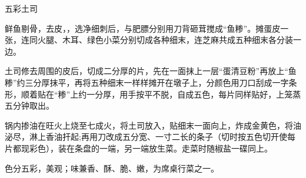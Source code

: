 \begin{recipe}{五彩土司}

\ingredients



\cooking

\step 鲜鱼剔骨，去皮，，选净细刺后，与肥膘分别用刀背砸茸搅成“鱼糁”。摊蛋皮一张，连同火腿、木耳、绿色小菜分别切成各种细末，连芝麻共成五种细末各分装一边。

\step 土司修去周围的皮后，切成二分厚的片，先在一面抹上一层“蛋清豆粉”再放上“鱼糁”约三分厚抹平，再将五种细末一样样摊开在墩子上，分颜色用刀口刮成一字条形，顺着贴在“糁”上约一分厚，用手按平不脱，自成五色，每片同样贴好，上笼蒸五分钟取出。

\step 锅内掺油在旺火上烧至七成火，将土司放入，贴细末一面向上，炸成金黄色，将油泌尽，淋上香油扞起;再用刀改成五分宽、一寸二长的条子（切时按五色切开使每片都现彩色），装在条盘的一端，另一端放生菜。走菜时随椒盐一碟同上。

\notes

色分五彩，美观；味兼香、酥、脆、嫩，为席桌行菜之一。

\end{recipe}


